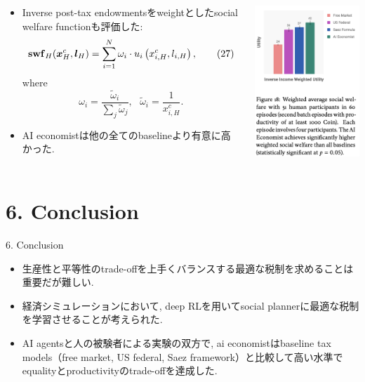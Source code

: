 \documentclass[unicode,aspectratio=169,11pt]{beamer}
\begin{document}
\begin{frame}{}{}
    \begin{columns}
        \begin{column}{0.6\textwidth}
            \begin{itemize}
                \item Inverse post-tax endowmentsをweightとしたsocial welfare functionも評価した:
                \[
                    {\bf swf}_{H}(\bm{x}_H^c, \bm{l}_H) = \sum_{i=1}^N \omega_i \cdot u_i\left(x_{i,H}^c, l_{i,H}\right), \tag{27}
                \]
                where
                \[\omega_i = \frac{\tilde{\omega}_i}{\sum_j \tilde{\omega}_j},
                \ \ \ \tilde{\omega}_i = \frac{1}{x^c_{i, H}}.\]
                \item AI economistは他の全てのbaselineより有意に高かった.
            \end{itemize}
        \end{column}
        \begin{column}{0.4\textwidth}
            \includegraphics[width=6cm]{figure18.png}
        \end{column}
    \end{columns}
\end{frame}

\section{6. Conclusion}

\begin{frame}{6. Conclusion}{}
    \begin{itemize}
        \item 生産性と平等性のtrade-offを上手くバランスする最適な税制を求めることは重要だが難しい.
        \item 経済シミュレーションにおいて, deep RLを用いてsocial plannerに最適な税制を学習させることが考えられた.
        \item AI agentsと人の被験者による実験の双方で, ai economistはbaseline tax models（free market, US federal, Saez framework）と比較して高い水準でequalityとproductivityのtrade-offを達成した.
    \end{itemize}
\end{frame}
\end{document}
